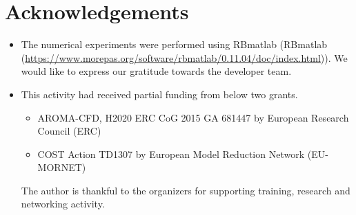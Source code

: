 \documentclass[graybox]{svmult}
\begin{document}
\section{Acknowledgements}

\begin{itemize}

\item The numerical experiments were performed using RBmatlab (RBmatlab (\url{https://www.morepas.org/software/rbmatlab/0.11.04/doc/index.html})). We would like to express our gratitude towards the developer team.

\item This activity had received partial funding from below two grants.
\begin{itemize}
\item AROMA-CFD, H2020 ERC CoG 2015 GA 681447 by European Research Council (ERC)
\item COST Action TD1307 by European Model Reduction Network (EU-MORNET)
\end{itemize}
The author is thankful to the organizers for supporting training, research and networking activity.

\end{itemize}



%
\end{document}
